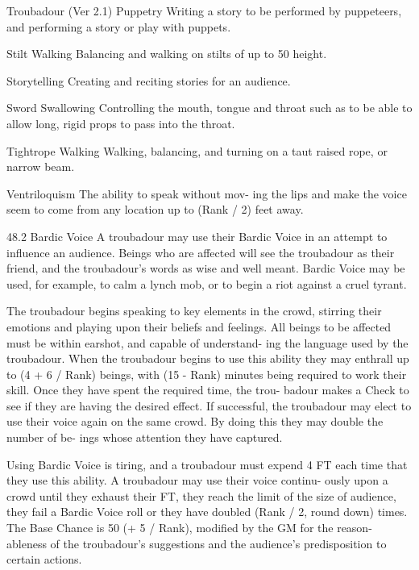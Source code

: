 \begin{Chapter}{Troubadour (Ver 2.1)}
Puppetry  Writing  a  story  to  be  performed  by 
puppeteers,  and  performing  a  story  or  play  with 
puppets. 

Stilt  Walking  Balancing  and  walking  on  stilts  of 
up  to  50%
height. 

Storytelling  Creating  and  reciting  stories  for  an 
audience. 

Sword Swallowing Controlling the mouth, tongue 
and  throat  such  as  to  be  able  to  allow  long,  rigid 
props to pass into the throat. 

Tightrope  Walking  Walking,  balancing,  and 
turning on a taut raised rope, or narrow beam. 

Ventriloquism  The  ability  to  speak  without  mov-
ing the lips and make the voice seem to come from 
any location up to (Rank / 2) feet away. 

48.2 Bardic Voice 
A  troubadour  may  use  their  Bardic  Voice  in  an 
attempt  to  influence  an  audience.  Beings  who  are 
affected will see the troubadour as their friend, and 
the  troubadour’s  words  as  wise  and  well  meant. 
Bardic Voice may be used, for example, to calm a 
lynch mob, or to begin a riot against a cruel tyrant.  

The troubadour begins speaking to key elements in 
the crowd, stirring their emotions and playing upon 
their beliefs and feelings. All beings to be affected 
must be within earshot, and capable of understand-
ing the language used by the troubadour. When the 
troubadour  begins  to  use  this  ability  they  may 
enthrall  up  to  (4  +  6  /  Rank)  beings,  with  (15  - 
Rank)  minutes  being  required  to  work  their  skill. 
Once  they  have  spent  the  required  time,  the  trou-
badour makes a Check to see if they are having the 
desired  effect.  If  successful,  the  troubadour  may 
elect  to  use  their  voice  again  on  the  same  crowd. 
By  doing  this  they  may  double  the  number  of  be-
ings whose attention they have captured.  

Using  Bardic  Voice  is  tiring,  and  a  troubadour 
must  expend  4  FT  each  time  that  they  use  this 
ability.  A  troubadour  may  use  their  voice  continu-
ously  upon  a  crowd  until  they  exhaust  their  FT, 
they  reach  the  limit  of  the  size  of  audience,  they 
fail a Bardic Voice roll or they have doubled (Rank 
/  2,  round  down)  times.  The  Base  Chance  is  50%
(+  5  /  Rank),  modified  by  the  GM  for  the  reason-
ableness  of  the  troubadour’s  suggestions  and  the 
audience’s predisposition to certain actions. 

\end{Chapter}
